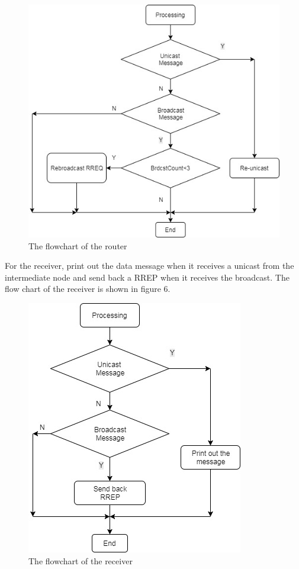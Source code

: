 \documentclass[a4paper]{article}
\begin{document}
\begin{figure}[!htb]
   \centering
   \includegraphics[scale=0.6]{flowchart2}
	\begin{center}
	   \caption{The flowchart of the router}
	\end{center}	   
    \label{fig:flowchart2}
\end{figure}


For the receiver, print out the data message when it receives a unicast from the intermediate node and send back a RREP when it receives the broadcast. The flow chart of the receiver is shown in figure 6.

\begin{figure}[!htb]
   \centering
   \includegraphics[scale=0.5]{flowchart3}
	\begin{center}
	   \caption{The flowchart of the receiver}
	\end{center}	   
    \label{fig:flowchart3}
\end{figure}
\end{document}
